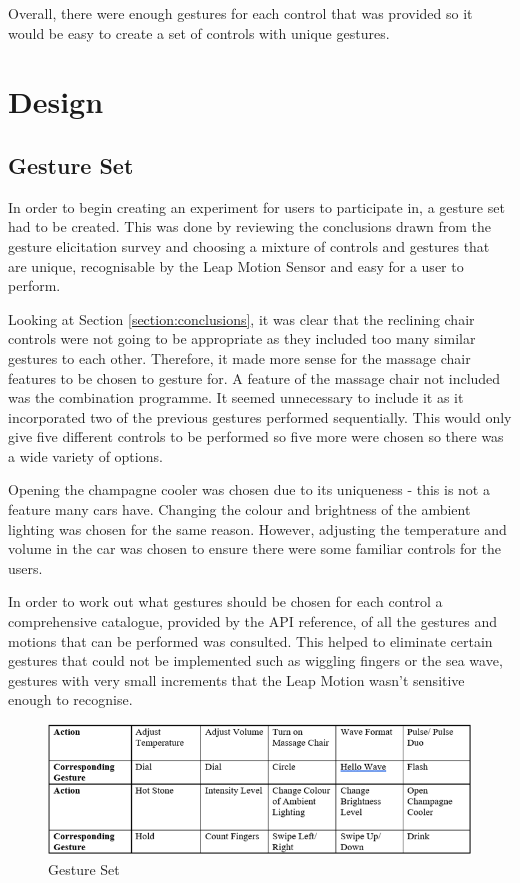 \documentclass{l4proj}
\begin{document}
Overall, there were enough gestures for each control that was provided so it would be easy to create a set of controls with unique gestures.


\chapter{Design}
\section{Gesture Set}
In order to begin creating an experiment for users to participate in, a gesture set had to be created. This was done by reviewing the conclusions drawn from the gesture elicitation survey and choosing a mixture of controls and gestures that are unique, recognisable by the Leap Motion Sensor and easy for a user to perform. 

Looking at Section \ref{section:conclusions}, it was clear that the reclining chair controls were not going to be appropriate as they included too many similar gestures to each other. Therefore, it made more sense for the massage chair features to be chosen to gesture for. A feature of the massage chair not included was the combination programme. It seemed unnecessary to include it as it incorporated two of the previous gestures performed sequentially. This would only give five different controls to be performed so five more were chosen so there was a wide variety of options. 

Opening the champagne cooler was chosen due to its uniqueness - this is not a feature many cars have. Changing the colour and brightness of the ambient lighting was chosen for the same reason. However, adjusting the temperature and volume in the car was chosen to ensure there were some familiar controls for the users. 

In order to work out what gestures should be chosen for each control a comprehensive catalogue, provided by the \cite{leapmotion_api_nodate} API reference, of all the gestures and motions that can be performed was consulted. This helped to eliminate certain gestures that could not be implemented such as wiggling fingers or the sea wave, gestures with very small increments that the Leap Motion wasn't sensitive enough to recognise.

\begin{figure}[!htb]
    \centering
    \includegraphics[scale = 0.8]{images/gestureDesign.png}
    \caption{Gesture Set}
    \label{fig:gestureDesign}
\end{figure}
\end{document}

